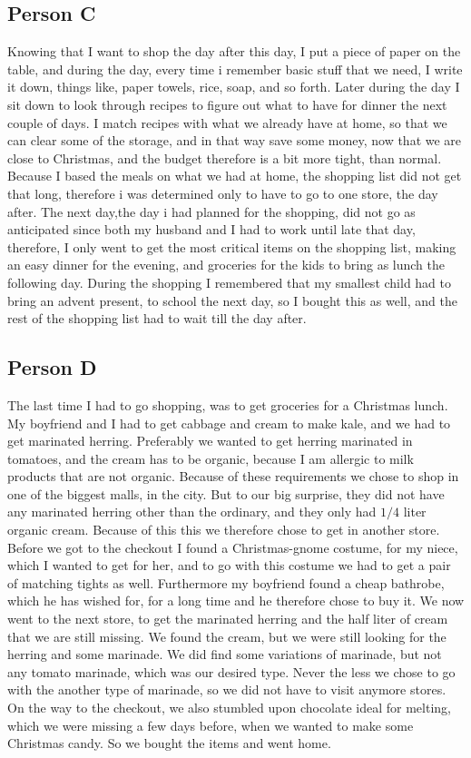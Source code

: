 \subsection{Person C}
Knowing that I want to shop the day after this day, I put a piece of paper on the table, and during the day, every time i remember basic stuff that we need, I write it down, things like, paper towels, rice, soap, and so forth. Later during the day I sit down to look through recipes to figure out what to have for dinner the next couple of days. I match recipes with what we already have at home, so that we can clear some of the storage, and in that way save some money, now that we are close to Christmas, and the budget therefore is a bit more tight, than normal. Because I based the meals on what we had at home, the shopping list did not get that long, therefore i was determined only to have to go to one store, the day after. The next day,the day i had planned for the shopping, did not go as anticipated since both my husband and I had to work until late that day, therefore, I only went to get the most critical items on the shopping list, making an easy dinner for the evening, and groceries for the kids to bring as lunch the following day. During the shopping I remembered that my smallest child had to bring an advent present, to school the next day, so I bought this as well, and the rest of the shopping list had to wait till the day after.

\subsection{Person D}
The last time I had to go shopping, was to get groceries for a Christmas lunch. My boyfriend and I had to get cabbage and cream to make kale, and we had to get marinated herring. Preferably we wanted to get herring marinated in tomatoes, and the cream has to be organic, because I am allergic to milk products that are not organic. Because of these requirements we chose to shop in one of the biggest malls, in the city. But to our big surprise, they did not have any marinated herring other than the ordinary, and they only had $1/4$ liter organic cream. Because of this this we therefore chose to get in another store. Before we got to the checkout I found a Christmas-gnome costume, for my niece, which I wanted to get for her, and to go with this costume we had to get a pair of matching tights as well. Furthermore my boyfriend found a cheap bathrobe, which he has wished for, for a long time and he therefore chose to buy it. We now went to the next store, to get the marinated herring and the half liter of cream that we are still missing. We found the cream, but we were still looking for the herring and some marinade. We did find some variations of marinade, but not any tomato marinade, which was our desired type. Never the less we chose to go with the another type of marinade, so we did not have to visit anymore stores. On the way to the checkout, we also stumbled upon chocolate ideal for melting, which we were missing a few days before, when we wanted to make some Christmas candy. So we bought the items and went home.

